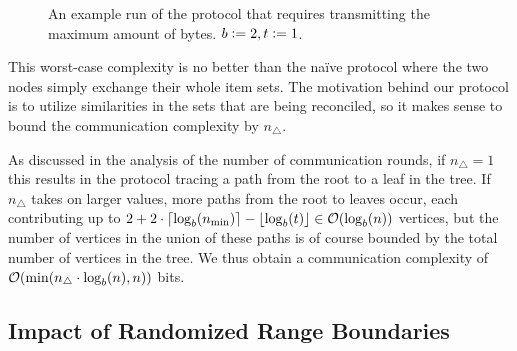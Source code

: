 \begin{figure*}
\begin{scaletikzpicturetowidth}{\textwidth}
\end{scaletikzpicturetowidth}

\caption{An example run of the protocol that requires transmitting the maximum amount of bytes. $b \vcentcolon= 2, t \vcentcolon= 1$.}

\label{fig:worst-bytes}
\end{figure*}

This worst-case complexity is no better than the naïve protocol where the two nodes simply exchange their whole item sets. The motivation behind our protocol is to utilize similarities in the sets that are being reconciled, so it makes sense to bound the communication complexity by $n_{\triangle}$.

As discussed in the analysis of the number of communication rounds, if $n_{\triangle} = 1$ this results in the protocol tracing a path from the root to a leaf in the tree. If $n_{\triangle}$ takes on larger values, more paths from the root to leaves occur, each contributing up to $2 + 2 \cdot\lceil\log_{b}(n_{\min})\rceil - \lfloor\log_{b}(t)\rfloor \in \mathcal{O}(\log_{b}(n))$ vertices, but the number of vertices in the union of these paths is of course bounded by the total number of vertices in the tree. We thus obtain a communication complexity of $\mathcal{O}(\min(n_{\triangle} \cdot \log_b(n), n))$ bits.

\subsection{Impact of Randomized Range Boundaries}
\label{random-boundaries}

